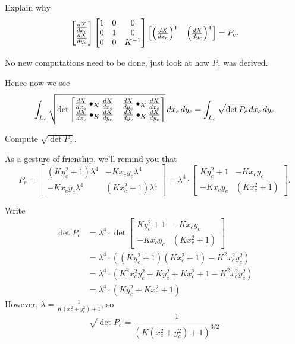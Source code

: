 \documentclass{ximera}
\begin{document}
\begin{problem}
  Explain why
  \[
\begin{bmatrix}
    \dd[X]{x_c}\\
    \dd[X]{y_c}
  \end{bmatrix}
  \begin{bmatrix}
    1 & 0 & 0\\
    0 & 1 & 0\\
    0 & 0 & K^{-1}
  \end{bmatrix}
  \begin{bmatrix}
    \left(\dd[X]{x_c}\right)^\transpose & \left(\dd[X]{y_c}\right)^\transpose
  \end{bmatrix} =P_c.
  \]
  \begin{hint}
    No new computations need to be done, just look at how $P_c$ was derived.
  \end{hint}
\end{problem}

Hence now we see 
\[
\int_{L_c} \sqrt{
  \det
  \begin{bmatrix}
    \dd[X]{x_c}\bullet_K \dd[X]{x_c} & \dd[X]{y_c}\bullet_K \dd[X]{x_c} \\
    \dd[X]{x_c}\bullet_K \dd[X]{y_c} & \dd[X]{y_c}\bullet_K \dd[X]{y_c}
  \end{bmatrix}
}\d x_c\d y_c = \int_{L_c} \sqrt{\det P_c}\d x_c\d y_c
\]
\begin{problem}
  Compute $\sqrt{\det P_c}$.
  \begin{hint}
    As a gesture of frienship, we'll remind you that
    \[
 P_c =
     \begin{bmatrix}
       \left(Ky_c^2+1\right)\lambda^4 & -Kx_{c}y_{c}\lambda^4\\
       -Kx_{c}y_{c}\lambda^4 & \left(Kx_c^2+1\right)\lambda^4
     \end{bmatrix} = \lambda^4 \cdot \begin{bmatrix}
       Ky_c^2+1 & -Kx_{c}y_{c}\\
       -Kx_{c}y_{c} & \left(Kx_c^2+1\right)
     \end{bmatrix}.
    \]
  \end{hint}
  \begin{freeResponse}
    Write
    \begin{align*}
    \det P_c &= \lambda^4\cdot \det \begin{bmatrix}
       Ky_c^2+1 & -Kx_{c}y_{c}\\
       -Kx_{c}y_{c} & \left(Kx_c^2+1\right)
    \end{bmatrix}\\
    &= \lambda^4\cdot\left(\left( Ky_c^2+1\right)\left(Kx_c^2+1\right) - K^2x_{c}^2y_{c}^2\right)\\
    &= \lambda^4\cdot\left(K^2x_{c}^2y_{c}^2 + Ky_c^2+Kx_c^2+1-K^2x_{c}^2y_{c}^2\right)\\
    &= \lambda^4\cdot\left(Ky_c^2+Kx_c^2+1\right)
    \end{align*}
    However, $\lambda = \frac{1}{K\left(x_c^2+y_c^2\right)+1}$, so
    \[
    \sqrt{\det P_c} = \frac{1}{\left(K\left(x_c^2+y_c^2\right)+1\right)^{3/2}}
    \]
  \end{freeResponse}
\end{problem}
\end{document}
